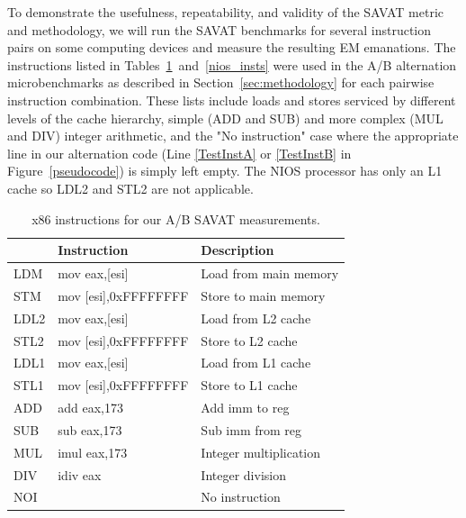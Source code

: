 To demonstrate the usefulness, repeatability, and validity of the SAVAT metric and methodology, we will run the SAVAT benchmarks for several instruction pairs on some computing devices and measure the resulting EM emanations. The instructions listed in Tables~\ref{insts}~and~\ref{nios_insts} were used in the A/B alternation microbenchmarks as described in Section~\ref{sec:methodology} for each pairwise instruction combination. These lists include loads and stores serviced by different levels of the cache hierarchy, simple (ADD and SUB) and more complex (MUL and DIV) integer arithmetic, and the "No instruction" case where the appropriate line in our alternation code (Line \ref{TestInstA} or \ref{TestInstB} in Figure~\ref{pseudocode}) is simply left empty. The NIOS processor has only an L1 cache so LDL2 and STL2 are not applicable. 

\begin{table}[htb]%
  \small%
  \label{insts}%
    \caption{x86 instructions for our A/B SAVAT measurements.}%
    \begin{tabular}{lll}%
    \toprule
    & \textbf{Instruction} & \textbf{Description} \\
    \midrule
    LDM  & mov eax,[esi]        & Load from main memory \\
    STM  & mov [esi],0xFFFFFFFF & Store to main memory  \\
    LDL2 & mov eax,[esi]        & Load from L2 cache    \\
    STL2 & mov [esi],0xFFFFFFFF & Store to L2 cache     \\
    LDL1 & mov eax,[esi]        & Load from L1 cache    \\
    STL1 & mov [esi],0xFFFFFFFF & Store to L1 cache     \\
    ADD  & add eax,173          & Add imm to reg  \\
    SUB  & sub eax,173          & Sub imm from reg \\
    MUL  & imul eax,173         & Integer multiplication \\
    DIV  & idiv eax             & Integer division       \\
    NOI  &                      & No instruction \\
    \bottomrule
        \end{tabular}%
\end{table}%

